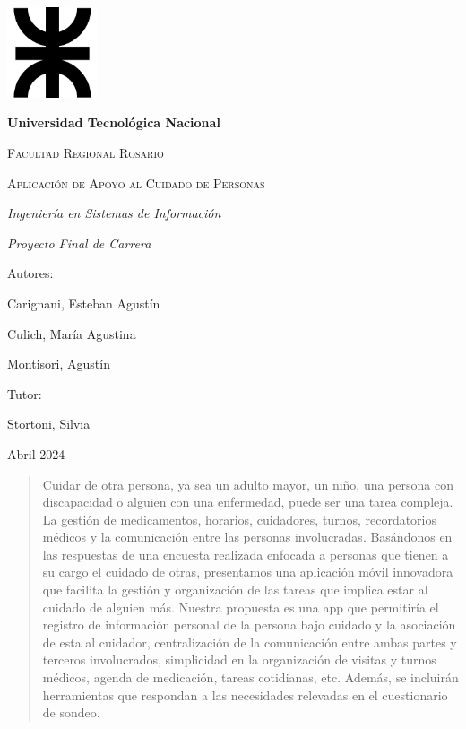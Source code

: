 \documentclass[a4paper,12pt]{article}
\begin{document}
    \begin{titlepage}
        \centering
        \includegraphics[width=0.2\textwidth]{Imagenes/LogoUTN.png}\par
        \vfill
        {\bfseries\LARGE Universidad Tecnológica Nacional \par}
        \vfill
        {\scshape\Large Facultad Regional Rosario \par}
        \vfill
        {\scshape\Huge Aplicación de Apoyo al Cuidado de Personas \par}
        \vfill
        {\itshape\Large Ingeniería en Sistemas de Información \par}
        {\itshape\Large Proyecto Final de Carrera \par}
        \vfill
        {\Large Autores: \par}
        {\Large Carignani, Esteban Agustín \par}
        {\Large Culich, María Agustina \par}
        {\Large Montisori, Agustín \par}
        \vfill
        {\Large Tutor: \par}
        {\Large Stortoni, Silvia \par}
        \vfill
        {\Large Abril 2024 \par}
    \end{titlepage}

    \begin{abstract}
        Cuidar de otra persona, ya sea un adulto mayor, 
        un niño, una persona con discapacidad o alguien 
        con una enfermedad, puede ser una tarea compleja. 
        La gestión de medicamentos, horarios, cuidadores, 
        turnos, recordatorios médicos y la comunicación 
        entre las personas involucradas.
        Basándonos en las respuestas de una encuesta realizada enfocada a personas que tienen a su cargo el cuidado de otras, presentamos una aplicación móvil innovadora que facilita la gestión y organización de las tareas que implica estar al cuidado de alguien más. Nuestra propuesta es una app que permitiría el registro de información personal de la persona bajo cuidado y la asociación de esta al cuidador, centralización de la comunicación entre ambas partes y terceros involucrados, simplicidad en la organización de visitas y turnos médicos, agenda de medicación, tareas cotidianas, etc. Además, se incluirán herramientas que respondan a las necesidades relevadas en el cuestionario de sondeo.
    \end{abstract}
\end{document}
